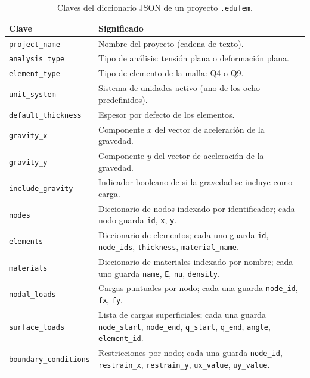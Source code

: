 \begin{table}[htbp]
\centering
\caption{Claves del diccionario JSON de un proyecto \texttt{.edufem}.}
\label{tab:edufem-claves}
\begin{tabular}{l p{9.2cm}}
\toprule
\textbf{Clave} & \textbf{Significado} \\
\midrule
\texttt{project\_name}       & Nombre del proyecto (cadena de texto). \\
\texttt{analysis\_type}      & Tipo de análisis: tensión plana o deformación plana. \\
\texttt{element\_type}       & Tipo de elemento de la malla: Q4 o Q9. \\
\texttt{unit\_system}        & Sistema de unidades activo (uno de los ocho predefinidos). \\
\texttt{default\_thickness}  & Espesor por defecto de los elementos. \\
\texttt{gravity\_x}          & Componente $x$ del vector de aceleración de la gravedad. \\
\texttt{gravity\_y}          & Componente $y$ del vector de aceleración de la gravedad. \\
\texttt{include\_gravity}    & Indicador booleano de si la gravedad se incluye como carga. \\
\texttt{nodes}               & Diccionario de nodos indexado por identificador; cada nodo guarda \texttt{id}, \texttt{x}, \texttt{y}. \\
\texttt{elements}            & Diccionario de elementos; cada uno guarda \texttt{id}, \texttt{node\_ids}, \texttt{thickness}, \texttt{material\_name}. \\
\texttt{materials}           & Diccionario de materiales indexado por nombre; cada uno guarda \texttt{name}, \texttt{E}, \texttt{nu}, \texttt{density}. \\
\texttt{nodal\_loads}        & Cargas puntuales por nodo; cada una guarda \texttt{node\_id}, \texttt{fx}, \texttt{fy}. \\
\texttt{surface\_loads}      & Lista de cargas superficiales; cada una guarda \texttt{node\_start}, \texttt{node\_end}, \texttt{q\_start}, \texttt{q\_end}, \texttt{angle}, \texttt{element\_id}. \\
\texttt{boundary\_conditions} & Restricciones por nodo; cada una guarda \texttt{node\_id}, \texttt{restrain\_x}, \texttt{restrain\_y}, \texttt{ux\_value}, \texttt{uy\_value}. \\
\bottomrule
\end{tabular}
\end{table}

